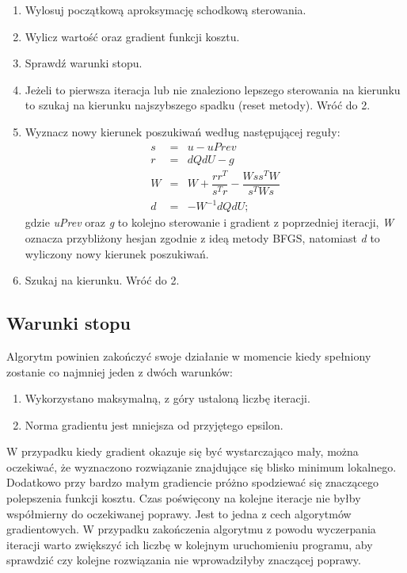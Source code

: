 \begin{enumerate}
\item Wylosuj początkową aproksymację schodkową sterowania.
\item Wylicz wartość oraz gradient funkcji kosztu.
\item Sprawdź warunki stopu.
\item Jeżeli to pierwsza iteracja lub nie znaleziono lepszego sterowania na kierunku to szukaj na kierunku najszybszego spadku (reset metody). Wróć do 2.
\item Wyznacz nowy kierunek poszukiwań według następującej reguły:
\begin{equation}
\begin{aligned}
s &=& u - uPrev\\
r &=& dQdU - g\\
W &=& W + \dfrac{rr^T}{s^Tr} - \dfrac{Wss^TW}{s^TWs}\\
d &=& -W^{-1}dQdU;
\end{aligned}
\end{equation}
gdzie \textit{uPrev} oraz \textit{g} to kolejno sterowanie i gradient z poprzedniej iteracji, \textit{W} oznacza przybliżony hesjan zgodnie z ideą metody BFGS, natomiast \textit{d} to wyliczony nowy kierunek poszukiwań.
\item Szukaj na kierunku. Wróć do 2.

\end{enumerate}

\subsection{Warunki stopu}
Algorytm powinien zakończyć swoje działanie w momencie kiedy spełniony zostanie co najmniej jeden z dwóch warunków: 
\begin{enumerate}
\item Wykorzystano maksymalną, z góry ustaloną liczbę iteracji.
\item Norma gradientu jest mniejsza od przyjętego epsilon.
\end{enumerate}
W przypadku kiedy gradient okazuje się być wystarczająco mały, można oczekiwać, że wyznaczono rozwiązanie znajdujące się blisko minimum lokalnego. Dodatkowo przy bardzo małym gradiencie próżno spodziewać się znaczącego polepszenia funkcji kosztu. Czas poświęcony na kolejne iteracje nie byłby współmierny do oczekiwanej poprawy. Jest to jedna z cech algorytmów gradientowych. W przypadku zakończenia algorytmu z powodu wyczerpania iteracji warto zwiększyć ich liczbę w kolejnym uruchomieniu programu, aby sprawdzić czy kolejne rozwiązania nie wprowadziłyby znaczącej poprawy.

